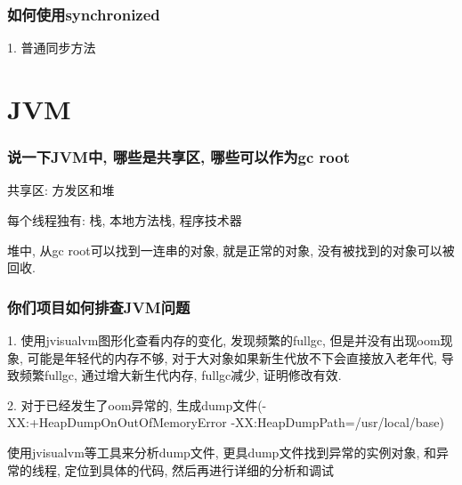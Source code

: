 \documentclass[UTF8]{ctexart}
\begin{document}
\subsubsection{如何使用synchronized}
1. 普通同步方法

\section{JVM}
\subsubsection{说一下JVM中, 哪些是共享区, 哪些可以作为gc root}
共享区: 方发区和堆 \par
每个线程独有: 栈, 本地方法栈, 程序技术器 \par
堆中, 从gc root可以找到一连串的对象, 就是正常的对象, 没有被找到的对象可以被回收.
\subsubsection{你们项目如何排查JVM问题}
1. 使用jvisualvm图形化查看内存的变化, 发现频繁的fullgc, 但是并没有出现oom现象, 可能是年轻代的内存不够, 对于大对象如果新生代放不下会直接放入老年代, 导致频繁fullgc, 通过增大新生代内存, fullgc减少, 证明修改有效. \par
2. 对于已经发生了oom异常的, 生成dump文件(-XX:+HeapDumpOnOutOfMemoryError -XX:HeapDumpPath=/usr/local/base) \par
使用jvisualvm等工具来分析dump文件, 更具dump文件找到异常的实例对象, 和异常的线程, 定位到具体的代码, 然后再进行详细的分析和调试 \par
\end{document}
